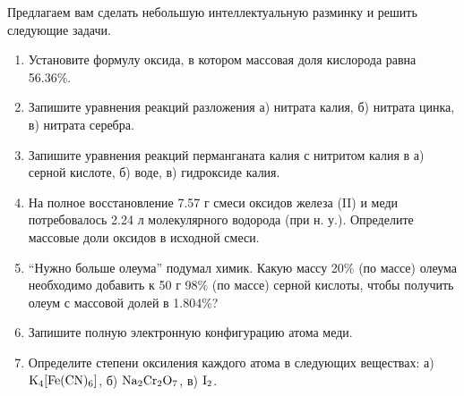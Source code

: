 

Предлагаем вам сделать небольшую интеллектуальную разминку и решить следующие задачи.

\begin{enumerate}
  \item Установите формулу оксида, в котором массовая доля кислорода равна 56.36\%.
  \item Запишите уравнения реакций разложения а) нитрата калия, б) нитрата цинка, в) нитрата серебра.
  \item Запишите уравнения реакций перманганата калия с нитритом калия в а) серной кислоте, б) воде, в) гидроксиде калия.
  \item На полное восстановление 7.57 г смеси оксидов железа (II) и меди потребовалось 2.24 л молекулярного водорода (при н. у.). Определите массовые доли оксидов в исходной смеси.
  \item ``Нужно больше олеума'' подумал химик. Какую массу 20\% (по массе) олеума необходимо добавить к 50 г 98\% (по массе) серной кислоты, чтобы получить олеум с массовой долей в 1.804\%?
  \item Запишите полную электронную конфигурацию атома меди.
  \item Определите степени оксиления каждого атома в следующих веществах: а) $\ce{K4[Fe(CN)6]}$, б) $\ce{Na2Cr2O7}$, в) $\ce{I2}$.
\end{enumerate}
